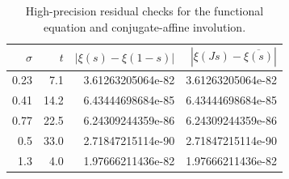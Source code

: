 \begin{table}[htbp]
\centering
\caption{High-precision residual checks for the functional equation and conjugate-affine involution.}
\label{tab:fe-residuals}
\begin{tabular}{rrrr}
\toprule
$\sigma$ & $t$ & $|\xi(s)-\xi(1-s)|$ & $|\xi(Js)-\overline{\xi(s)}|$\\
\midrule
0.23 & 7.1 & 3.61263205064e-82 & 3.61263205064e-82\\
0.41 & 14.2 & 6.43444698684e-85 & 6.43444698684e-85\\
0.77 & 22.5 & 6.24309244359e-86 & 6.24309244359e-86\\
0.5 & 33.0 & 2.71847215114e-90 & 2.71847215114e-90\\
1.3 & 4.0 & 1.97666211436e-82 & 1.97666211436e-82\\
\bottomrule
\end{tabular}
\end{table}
